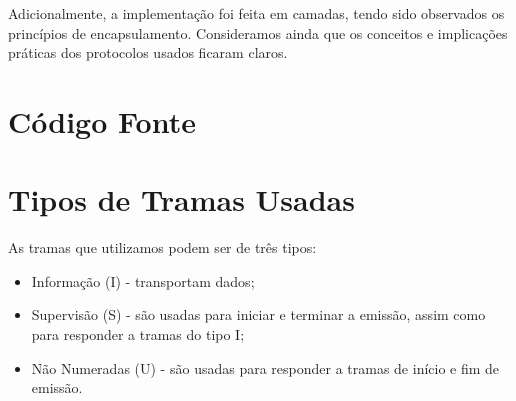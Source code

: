 \documentclass[11pt,a4paper,reqno]{report}
\numberwithin{equation}{section}
\begin{document}
Adicionalmente, a implementação foi feita em camadas, tendo sido observados os princípios de encapsulamento. Consideramos ainda que os conceitos e implicações práticas dos protocolos usados ficaram claros.


%
%

\begin{appendices}

\chapter{Código Fonte}












\chapter{Tipos de Tramas Usadas}
\label{tramas}

As tramas que utilizamos podem ser de três tipos:
\begin{itemize}
	\item Informação (I) - transportam dados;
	\item Supervisão (S) - são usadas para iniciar e terminar a emissão, assim como para responder a tramas do tipo I;
	\item Não Numeradas (U) - são usadas para responder a tramas de início e fim de emissão.
\end{itemize}


\end{appendices}
\end{document}
